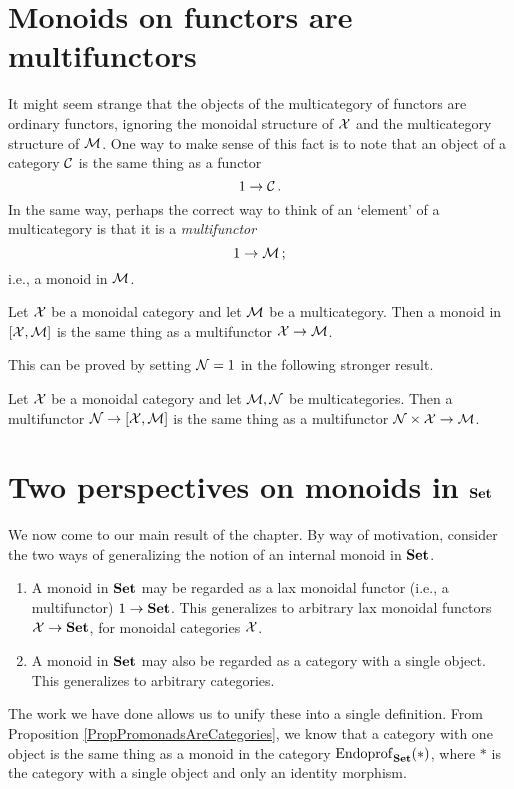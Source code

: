 \documentclass{report}[11pt]
\begin{document}
\section{Monoids on functors are multifunctors}
It might seem strange that the objects of the multicategory of functors are ordinary functors, ignoring the monoidal structure of $\mathcal X$ and the multicategory structure of $\mathcal M$.  
One way to make sense of this fact is to note that an object of a category ${\mathcal{C}}$ is the same thing as a functor
\[
  1 \to {\mathcal{C}}\,.
  \]
In the same way, perhaps the correct way to think of an `element' of a multicategory is that it is a \emph{multifunctor}
\[
  1 \to \mathcal M\,;
  \]
i.e., a monoid in $\mathcal M$.

\begin{proposition}
  Let $\mathcal X$ be a monoidal category and let $\mathcal M$ be a multicategory.  
  Then a monoid in $[\mathcal X,\mathcal M]$ is the same thing as a multifunctor $\mathcal X \to \mathcal M$.
  \label{PropMonoidInXMIsMultifunctorXToM}
\end{proposition}

This can be proved by setting $\mathcal N=1$ in the following stronger result.

\begin{proposition}
  Let $\mathcal X$ be a monoidal category and let $\mathcal M,\mathcal N$ be multicategories.  
  \label{PropPisani}
  Then a multifunctor $\mathcal N \to [\mathcal X,\mathcal M]$ is the same thing as a multifunctor $\mathcal N\times\mathcal X \to \mathcal M$.
\end{proposition}

\section{Two perspectives on monoids in ${\normalfont\textbf{Set}}$}

We now come to our main result of the chapter.  
By way of motivation, consider the two ways of generalizing the notion of an internal monoid in ${\normalfont\textbf{Set}}$.

\begin{enumerate}
  \item A monoid in ${\normalfont\textbf{Set}}$ may be regarded as a lax monoidal functor (i.e., a multifunctor) $1 \to {\normalfont\textbf{Set}}$.  
    This generalizes to arbitrary lax monoidal functors $\mathcal X \to {\normalfont\textbf{Set}}$, for monoidal categories $\mathcal X$.
  \item A monoid in ${\normalfont\textbf{Set}}$ may also be regarded as a category with a single object.  
    This generalizes to arbitrary categories.
\end{enumerate}

The work we have done allows us to unify these into a single definition.  
From Proposition \ref{PropPromonadsAreCategories}, we know that a category with one object is the same thing as a monoid in the category $\operatorname{Endoprof}_{\normalfont\textbf{Set}}(*)$, where $*$ is the category with a single object and only an identity morphism.
\end{document}
